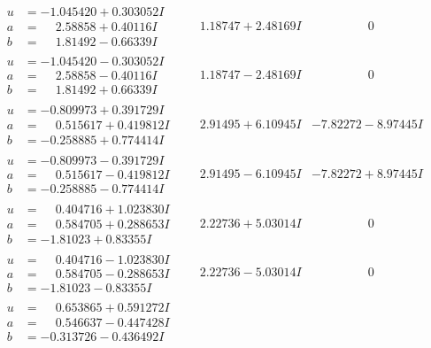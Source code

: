 \documentclass[1p]{elsarticle_modified}
\theoremstyle{definition}
\begin{document}
$$\begin{array}{c|c|c}
\begin{aligned}
u &= -1.045420 + 0.303052 I \\
a &= \phantom{-}2.58858 + 0.40116 I \\
b &= \phantom{-}1.81492 - 0.66339 I\end{aligned}
 & \phantom{-}1.18747 + 2.48169 I & \phantom{-0.000000 } 0 \\ \hline\begin{aligned}
u &= -1.045420 - 0.303052 I \\
a &= \phantom{-}2.58858 - 0.40116 I \\
b &= \phantom{-}1.81492 + 0.66339 I\end{aligned}
 & \phantom{-}1.18747 - 2.48169 I & \phantom{-0.000000 } 0 \\ \hline\begin{aligned}
u &= -0.809973 + 0.391729 I \\
a &= \phantom{-}0.515617 + 0.419812 I \\
b &= -0.258885 + 0.774414 I\end{aligned}
 & \phantom{-}2.91495 + 6.10945 I & -7.82272 - 8.97445 I \\ \hline\begin{aligned}
u &= -0.809973 - 0.391729 I \\
a &= \phantom{-}0.515617 - 0.419812 I \\
b &= -0.258885 - 0.774414 I\end{aligned}
 & \phantom{-}2.91495 - 6.10945 I & -7.82272 + 8.97445 I \\ \hline\begin{aligned}
u &= \phantom{-}0.404716 + 1.023830 I \\
a &= \phantom{-}0.584705 + 0.288653 I \\
b &= -1.81023 + 0.83355 I\end{aligned}
 & \phantom{-}2.22736 + 5.03014 I & \phantom{-0.000000 } 0 \\ \hline\begin{aligned}
u &= \phantom{-}0.404716 - 1.023830 I \\
a &= \phantom{-}0.584705 - 0.288653 I \\
b &= -1.81023 - 0.83355 I\end{aligned}
 & \phantom{-}2.22736 - 5.03014 I & \phantom{-0.000000 } 0 \\ \hline\begin{aligned}
u &= \phantom{-}0.653865 + 0.591272 I \\
a &= \phantom{-}0.546637 - 0.447428 I \\
b &= -0.313726 - 0.436492 I\end{aligned}

\end{array}$$
\end{document}
